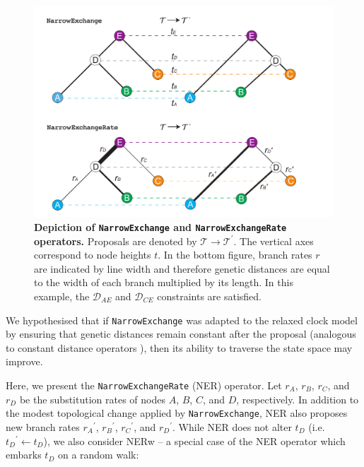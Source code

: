 \documentclass[10pt,letterpaper]{article}
\begin{document}
\begin{figure}[!h]
\includegraphics[width=\textwidth]{Figures/NarrowExchange.pdf}
\caption{\textbf{Depiction of \texttt{NarrowExchange} and \texttt{NarrowExchangeRate} operators.} Proposals are denoted by $\mathcal{T} \rightarrow \mathcal{T}^\prime$. The vertical axes correspond to node heights $t$. In the bottom figure, branch rates $r$ are indicated by line width and therefore genetic distances are equal to the width of each branch multiplied by its length. 
In this example, the $\mathcal{D}_{AE}$ and $\mathcal{D}_{CE}$ constraints are satisfied.
}
\label{fig:narrowexchange}
\end{figure}



We hypothesised that if \texttt{NarrowExchange} was adapted to the relaxed clock model by ensuring that genetic distances remain constant after the proposal (analogous to constant distance operators \cite{zhang2020improving}), then its ability to traverse the state space may improve. 




Here, we present the \texttt{NarrowExchangeRate} (NER) operator. 
Let $r_A$, $r_B$, $r_C$, and $r_D$ be the substitution rates of nodes $A$, $B$, $C$, and $D$, respectively. 
In addition to the modest topological change applied by \texttt{NarrowExchange}, NER also proposes new branch rates ${r_A}^\prime$, ${r_B}^\prime$, ${r_C}^\prime$, and ${r_D}^\prime$. While NER does not alter $t_D$ (i.e. ${t_D}^\prime \leftarrow t_D$), we also consider NERw -- a special case of the NER operator which embarks $t_D$ on a random walk:
\end{document}
